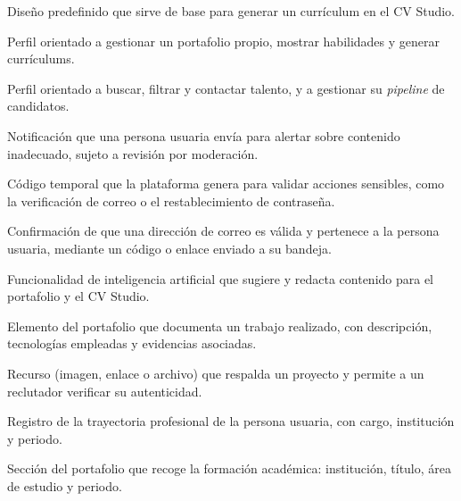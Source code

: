 \begin{description}[style=unboxed,leftmargin=0pt,itemsep=4pt]
    \item[\textcolor{colorPrimario}{\textbf{Plantilla}}] Diseño predefinido que sirve de
    base para generar un currículum en el CV Studio.

    \item[\textcolor{colorPrimario}{\textbf{Profesional}}] Perfil orientado a gestionar
    un portafolio propio, mostrar habilidades y generar currículums.

    \item[\textcolor{colorPrimario}{\textbf{Reclutador}}] Perfil orientado a buscar,
    filtrar y contactar talento, y a gestionar su \textit{pipeline} de candidatos.

    \item[\textcolor{colorPrimario}{\textbf{Reporte}}] Notificación que una persona
    usuaria envía para alertar sobre contenido inadecuado, sujeto a revisión por
    moderación.

    \item[\textcolor{colorPrimario}{\textbf{Token}}] Código temporal que la plataforma
    genera para validar acciones sensibles, como la verificación de correo o el
    restablecimiento de contraseña.

    \item[\textcolor{colorPrimario}{\textbf{Verificación}}] Confirmación de que una
    dirección de correo es válida y pertenece a la persona usuaria, mediante un código o
    enlace enviado a su bandeja.

    \item[\textcolor{colorPrimario}{\textbf{Asistente IA}}] Funcionalidad de
    inteligencia artificial que sugiere y redacta contenido para el portafolio y el CV
    Studio.

    \item[\textcolor{colorPrimario}{\textbf{Proyecto}}] Elemento del portafolio que
    documenta un trabajo realizado, con descripción, tecnologías empleadas y evidencias
    asociadas.

    \item[\textcolor{colorPrimario}{\textbf{Evidencia}}] Recurso (imagen, enlace o
    archivo) que respalda un proyecto y permite a un reclutador verificar su autenticidad.

    \item[\textcolor{colorPrimario}{\textbf{Experiencia laboral}}] Registro de la
    trayectoria profesional de la persona usuaria, con cargo, institución y periodo.

    \item[\textcolor{colorPrimario}{\textbf{Educación}}] Sección del portafolio que
    recoge la formación académica: institución, título, área de estudio y periodo.


\end{description}
